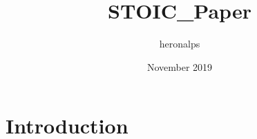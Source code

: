 \documentclass{article}
\title{STOIC_Paper}
\author{heronalps }
\date{November 2019}
\begin{document}
\maketitle

\section{Introduction}
\end{document}
